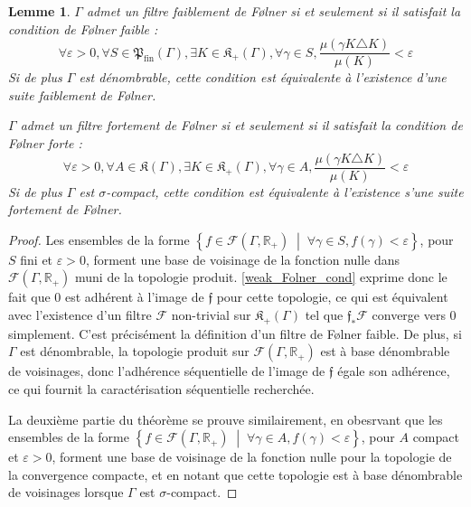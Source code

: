 \documentclass[a4paper,12pt]{article}
\newtheorem{lemma}[theorem]{Lemme}
\newcommand{\R}{\mathbb{R}}
\newcommand{\set}[1]{\left\{ #1 \right\}}
\newcommand{\tq}{\;\middle|\;}
\newcommand{\ssi}{si et seulement si }
\newcommand{\finparts}{\mathfrak{P}_{\mathrm{fin}}}
\begin{document}
\begin{lemma}\label{Folner_filter_of_cond}
    $\Gamma$ admet un filtre faiblement de F\o{}lner \ssi il satisfait la 
    \emph{condition de F\o{}lner faible} :
    \begin{equation}\label{weak_Folner_cond}\tag{WF}
        \forall\varepsilon>0, \forall S\in\finparts(\Gamma), \exists K\in\mathfrak{K}_+(\Gamma), \forall \gamma\in S, 
        \frac{\mu(\gamma K\triangle K)}{\mu(K)}<\varepsilon
    \end{equation}
    Si de plus $\Gamma$ est dénombrable, cette condition est équivalente à l'existence d'une \emph{suite} faiblement de F\o{}lner.

    $\Gamma$ admet un filtre fortement de F\o{}lner \ssi il satisfait la \emph{condition de F\o{}lner forte} : 
    \begin{equation}\label{strong_Folner_cond}\tag{SF}
        \forall\varepsilon>0, \forall A\in\mathfrak{K}(\Gamma), \exists K\in\mathfrak{K}_+(\Gamma), \forall\gamma\in A, 
        \frac{\mu(\gamma K\triangle K)}{\mu(K)}<\varepsilon
    \end{equation}
    Si de plus $\Gamma$ est $\sigma$-compact, cette condition est équivalente à l'existence s'une \emph{suite} fortement de F\o{}lner.
\end{lemma}

\begin{proof}
    Les ensembles de la forme $\set{f \in \mathcal{F}(\Gamma, \R_+) \tq \forall\gamma\in S, f(\gamma) < \varepsilon}$, pour $S$ fini et $\varepsilon>0$, 
    forment une base de voisinage de la fonction nulle dans $\mathcal{F}(\Gamma, \R_+)$ muni de la topologie produit. \eqref{weak_Folner_cond} exprime donc 
    le fait que $0$ est adhérent à l'image de $\mathfrak{f}$ pour cette topologie, ce qui est équivalent avec 
    l'existence d'un filtre $\mathscr{F}$ non-trivial sur $\mathfrak{K}_+(\Gamma)$ tel que $\mathfrak{f}_*\mathscr{F}$ converge vers $0$
    simplement. C'est précisément la définition d'un filtre de F\o{}lner faible.
    De plus, si $\Gamma$ est dénombrable, la topologie produit sur $\mathcal{F}(\Gamma, \R_+)$ est à base dénombrable de voisinages,
    donc l'adhérence séquentielle de l'image de $\mathfrak{f}$ égale son adhérence, ce qui fournit la caractérisation séquentielle recherchée.

    La deuxième partie du théorème se prouve similairement, en obesrvant que les ensembles de la forme 
    $\set{f \in \mathcal{F}(\Gamma, \R_+) \tq \forall\gamma\in A, f(\gamma) < \varepsilon}$, pour $A$ compact et $\varepsilon>0$, 
    forment une base de voisinage de la fonction nulle pour la topologie de la convergence compacte, et en notant que cette 
    topologie est à base dénombrable de voisinages lorsque $\Gamma$ est $\sigma$-compact.
\end{proof}
\end{document}
